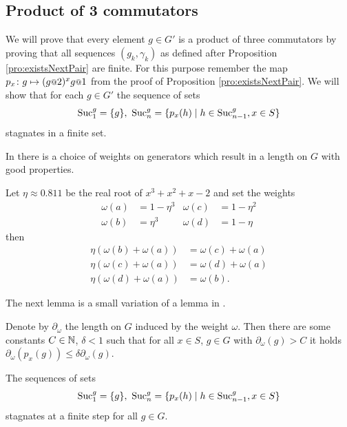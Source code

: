 \documentclass[a4paper,11pt]{amsart}
\begin{document}
\subsection{Product of 3 commutators}
We will prove that every element $g\in G'$ is a product of three commutators by proving that all
sequences $(g_k,\gamma_k)$ as defined after Proposition \ref{pro:existsNextPair} are finite.
For this purpose remember the map $p_x\colon g \mapsto (g\at{2})^x g\at{1}$ from the proof of Proposition \ref{pro:existsNextPair}.
We will show that for each $g\in G'$ the sequence of sets 
\[\textup{Suc}_1^g=\{g\},\ \textup{Suc}_n^g = \{p_x(h) \mid h\in \textup{Suc}_{n-1}^g, x\in S\} \]
stagnates in a finite set. 

In \cite{Bartholdi:Growth} there is a choice of weights on generators which result in a length on $G$ with good properties.
\begin{lem} \label{lem:laurentsweights}
 Let $\eta\approx 0.811$ be the real root of $x^3+x^2+x-2$ and set the weights 
 \begin{align*}
  \omega(a) &= 1-\eta^3 & \omega(c)&=1-\eta^2 \\ \omega(b)&= \eta^3 & \omega(d)&=1-\eta
 \end{align*}
 then 
 \begin{align*}
  \eta(\omega(b)+\omega(a)) &= \omega(c)+\omega(a) \\
  \eta(\omega(c)+\omega(a)) &= \omega(d)+\omega(a) \\
  \eta(\omega(d)+\omega(a)) &= \omega(b).
 \end{align*}
\end{lem}
The next lemma is a small variation of a lemma in \cite{Bartholdi:Growth}.
\begin{lem}
 Denote by $\partial_\omega$ the length on $G$ induced by the weight $\omega$. Then
 there are some constants $C\in\mathbb{N}$, $\delta<1$ such that for all $x\in S$, $g\in G$ 
 with $\partial_\omega(g)>C$ it holds 
 $\partial_\omega(p_x(g)) \leq \delta \partial_\omega(g)$.
\end{lem}
\begin{cor}
The sequences of sets
 \[\textup{Suc}_1^g=\{g\},\ \textup{Suc}_n^g = \{p_x(h) \mid h\in \textup{Suc}_{n-1}^g, x\in S\} \]
 stagnates at a finite step for all $g\in G$.
\end{cor}
\end{document}
